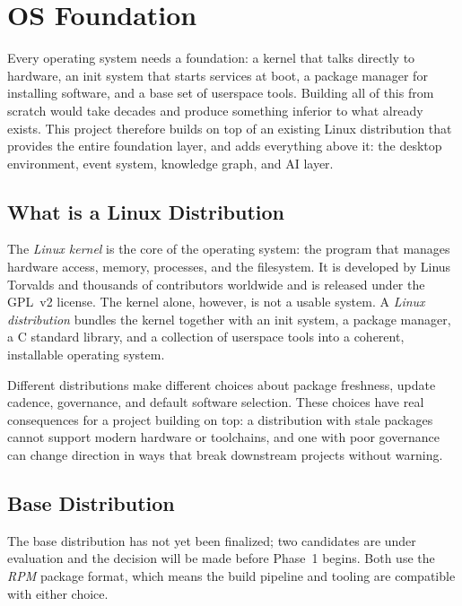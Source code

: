 \section{OS Foundation}
\label{sec:foundation}

Every operating system needs a foundation: a kernel that talks directly to
hardware, an init system that starts services at boot, a package manager for
installing software, and a base set of userspace tools. Building all of this
from scratch would take decades and produce something inferior to what already
exists. This project therefore builds on top of an existing Linux distribution
that provides the entire foundation layer, and adds everything above it: the
desktop environment, event system, knowledge graph, and AI layer.

\subsection{What is a Linux Distribution}
\label{sec:what-is-distro}

The \emph{Linux kernel} is the core of the operating system: the program that
manages hardware access, memory, processes, and the filesystem. It is developed
by Linus Torvalds and thousands of contributors worldwide and is released under
the GPL~v2 license. The kernel alone, however, is not a usable system. A
\emph{Linux distribution} bundles the kernel together with an init system, a
package manager, a C standard library, and a collection of userspace tools into
a coherent, installable operating system.

Different distributions make different choices about package freshness, update
cadence, governance, and default software selection. These choices have real
consequences for a project building on top: a distribution with stale packages
cannot support modern hardware or toolchains, and one with poor governance can
change direction in ways that break downstream projects without warning.

\subsection{Base Distribution}
\label{sec:base-distro}

The base distribution has not yet been finalized; two candidates are under
evaluation and the decision will be made before Phase~1 begins. Both use the
\emph{RPM} package format, which means the build pipeline and tooling are
compatible with either choice.

